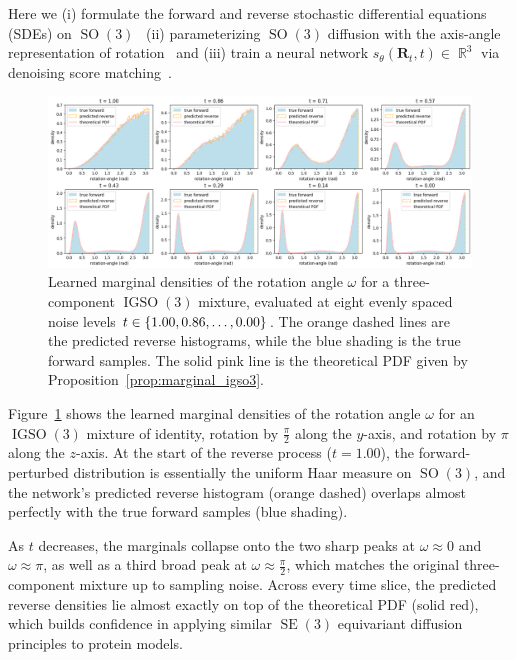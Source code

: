 \documentclass{article}
\theoremstyle{plain}
\theoremstyle{definition}
\theoremstyle{remark}
\DeclareMathOperator{\SE}{SE}
\DeclareMathOperator{\SO}{SO}
\DeclareMathOperator{\IGSO}{IGSO}
\DeclareMathOperator{\R}{\mathbb{R}}
\begin{document}
Here we (i) formulate the forward and reverse stochastic differential equations (SDEs) on $\SO(3)$~\cite{riemannian_diffusion,sde_on_manifolds_hsu}
(ii) parameterizing $\SO(3)$ diffusion with the axis-angle representation of rotation~\cite{micro_lie_theory} and (iii) train a neural network $s_\theta(\mathbf{R}_t, t) \in \R^3$ via denoising score matching~\cite{score_based_diffusion}.

\begin{figure}[!ht]
    \centering
    \includegraphics[width=\linewidth]{figures/train_visualization.png}
    \caption{Learned marginal densities of the rotation angle $\omega$ for a three-component $\IGSO(3)$ mixture, evaluated at eight evenly spaced noise levels $t\in\qty{1.00,0.86,\dots,0.00}$. The orange dashed lines are the predicted reverse histograms, while the blue shading is the true forward samples. The solid pink line is the theoretical PDF given by Proposition~\ref{prop:marginal_igso3}.}
    \label{fig:train_visualization}
\end{figure}

Figure~\ref{fig:train_visualization} shows the learned marginal densities of the rotation angle $\omega$ for an $\IGSO(3)$ mixture of identity, rotation by $\frac{\pi}{2}$ along the $y$-axis, and rotation by $\pi$ along the $z$-axis. At the start of the reverse process ($t=1.00$), the forward-perturbed distribution is essentially the uniform Haar measure on $\SO(3)$, and the network's predicted reverse histogram (orange dashed) overlaps almost perfectly with the true forward samples (blue shading).

As $t$ decreases, the marginals collapse onto the two sharp peaks at $\omega\approx0$ and $\omega\approx\pi$, as well as a third broad peak at $\omega\approx\frac{\pi}{2}$, which matches the original three-component mixture up to sampling noise. Across every time slice, the predicted reverse densities lie almost exactly on top of the theoretical PDF (solid red), which builds confidence in applying similar $\SE(3)$ equivariant diffusion principles to protein models.
\end{document}
